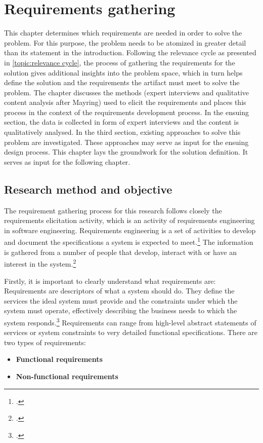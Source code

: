 \chapter{Requirements gathering} \label{chap:ReqEng}

This chapter determines which requirements are needed in order to solve the problem. For this purpose, the problem needs to be atomized in greater detail than its statement in the introduction. Following the relevance cycle as presented in \ref{topic:relevance cycle}, the process of gathering the requirements for the solution gives additional insights into the problem space, which in turn helps define the solution and the requirements the artifact must meet to solve the problem. The chapter discusses the methods (expert interviews and qualitative content analysis after Mayring) used to elicit the requirements and places this process in the context of the requirements development process. In the ensuing section, the data is collected in form of expert interviews and the content is qualitatively analysed. In the third section, existing approaches to solve this problem are investigated. These approaches may serve as input for the ensuing design process. This chapter lays the groundwork for the solution definition. It serves as input for the following chapter. 

\section{Research method and objective}
The requirement gathering process for this research follows closely the requirements elicitation activity, which is an activity of requirements engineering in software engineering. Requirements engineering is a set of activities to develop and document the specifications a system is expected to meet.\footcite[Cf.][p.16]{SommervilleIntegratedrequirementsengineering2005} The information is gathered from a number of people that develop, interact with or have an interest in the system.\footcite[Cf.][p.38]{PatakiSystemRequirementsAnalysis2003} 

Firstly, it is important to clearly understand what requirements are: Requirements are descriptors of what a system should do. They define the services the ideal system must provide and the constraints under which the system must operate, effectively describing the business needs to which the system responds.\footcite[Cf.][p.100]{SommervilleSoftwareengineering2011} Requirements can range from high-level abstract statements of services or system constraints to very detailed functional specifications. There are two types of requirements: 
\begin{itemize}
    \item \textbf{Functional requirements}
    \item \textbf{Non-functional requirements} 
\end{itemize}


